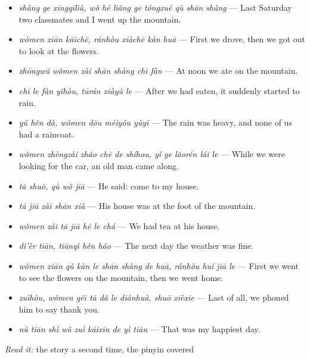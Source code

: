 \begin{tcolorbox}[breakable,skin=enhanced,colback=orange!6,colframe=orange!45!black,boxrule=0.5pt,arc=1mm,left=6pt,right=6pt,top=4pt,bottom=4pt,fonttitle=\bfseries,title={Read this}]
\begin{itemize}
\raggedright
  \item \emph{shàng ge xīngqīliù, wǒ hé liǎng ge tóngxué qù shān shàng} — Last Saturday two classmates and I went up the mountain.
  \item \emph{wǒmen xiān kāichē, ránhòu xiàchē kàn huā} — First we drove, then we got out to look at the flowers.
  \item \emph{zhōngwǔ wǒmen zài shān shàng chī fàn} — At noon we ate on the mountain.
  \item \emph{chī le fàn yǐhòu, tūrán xiàyǔ le} — After we had eaten, it suddenly started to rain.
  \item \emph{yǔ hěn dà, wǒmen dōu méiyǒu yǔyī} — The rain was heavy, and none of us had a raincoat.
  \item \emph{wǒmen zhèngzài zhǎo chē de shíhou, yí ge lǎorén lái le} — While we were looking for the car, an old man came along.
  \item \emph{tā shuō, qù wǒ jiā} — He said: come to my house.
  \item \emph{tā jiā zài shān xià} — His house was at the foot of the mountain.
  \item \emph{wǒmen zài tā jiā hē le chá} — We had tea at his house.
  \item \emph{dì'èr tiān, tiānqì hěn hǎo} — The next day the weather was fine.
  \item \emph{wǒmen xiān qù kàn le shān shàng de huā, ránhòu huí jiā le} — First we went to see the flowers on the mountain, then we went home.
  \item \emph{zuìhòu, wǒmen gěi tā dǎ le diànhuà, shuō xièxie} — Last of all, we phoned him to say thank you.
  \item \emph{nà tiān shì wǒ zuì kāixīn de yì tiān} — That was my happiest day.
\end{itemize}
\end{tcolorbox}

\begin{tcolorbox}[breakable,skin=enhanced,colback=orange!6,colframe=orange!45!black,boxrule=0.5pt,arc=1mm,left=6pt,right=6pt,top=4pt,bottom=4pt,fonttitle=\bfseries,title={Read this}]
\emph{Read it:} the story a second time, the pinyin covered
\end{tcolorbox}

